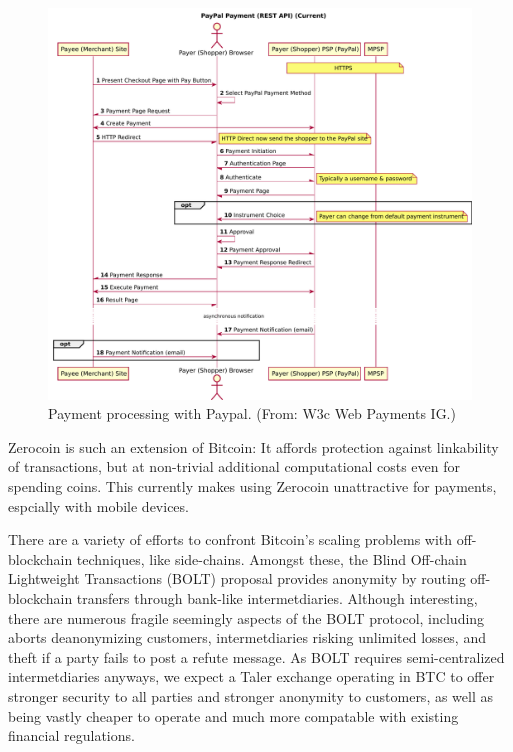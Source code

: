 \documentclass{llncs}
\begin{document}
\begin{figure}[b!]
\includegraphics[width=\textwidth]{figs/paypal.pdf}
\caption{Payment processing with Paypal. (From: W3c Web Payments IG.)}
\label{fig:paypal}
\end{figure}


Zerocoin \cite{miers2013zerocoin} is such an extension of Bitcoin:
It affords protection against linkability of transactions,
but at non-trivial additional computational costs even for
spending coins.  This currently makes using Zerocoin unattractive
for payments, espcially with mobile devices.  

There are a variety of efforts to confront Bitcoin's scaling problems
with off-blockchain techniques, like side-chains. %
Amongst these, the Blind Off-chain Lightweight Transactions (BOLT)
proposal \cite{BOLT} provides anonymity by routing off-blockchain
transfers through bank-like intermetdiaries.  Although interesting,
there are numerous fragile seemingly aspects of the BOLT protocol,
including aborts deanonymizing customers, intermetdiaries risking
unlimited losses, and theft if a party fails to post a refute message.
As BOLT requires semi-centralized intermetdiaries anyways,
we expect a Taler exchange operating in BTC to offer stronger
security to all parties and stronger anonymity to customers,
as well as being vastly cheaper to operate and much more compatable
with existing financial regulations. 
\end{document}
